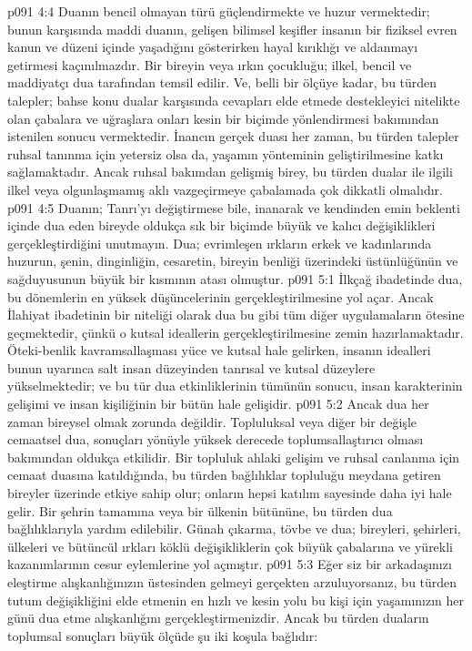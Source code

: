 \vs p091 4:4 Duanın bencil olmayan türü güçlendirmekte ve huzur vermektedir; bunun karşısında maddi duanın, gelişen bilimsel keşifler insanın bir fiziksel evren kanun ve düzeni içinde yaşadığını gösterirken hayal kırıklığı ve aldanmayı getirmesi kaçınılmazdır. Bir bireyin veya ırkın çocukluğu; ilkel, bencil ve maddiyatçı dua tarafından temsil edilir. Ve, belli bir ölçüye kadar, bu türden talepler; bahse konu dualar karşısında cevapları elde etmede destekleyici nitelikte olan çabalara ve uğraşlara onları kesin bir biçimde yönlendirmesi bakımından istenilen sonucu vermektedir. İnancın gerçek duası her zaman, bu türden talepler ruhsal tanınma için yetersiz olsa da, yaşamın yönteminin geliştirilmesine katkı sağlamaktadır. Ancak ruhsal bakımdan gelişmiş birey, bu türden dualar ile ilgili ilkel veya olgunlaşmamış aklı vazgeçirmeye çabalamada çok dikkatli olmalıdır.
\vs p091 4:5 Duanın; Tanrı’yı değiştirmese bile, inanarak ve kendinden emin beklenti içinde dua eden bireyde oldukça sık bir biçimde büyük ve kalıcı değişiklikleri gerçekleştirdiğini unutmayın. Dua; evrimleşen ırkların erkek ve kadınlarında huzurun, şenin, dinginliğin, cesaretin, bireyin benliği üzerindeki üstünlüğünün ve sağduyusunun büyük bir kısmının atası olmuştur.
\vs p091 5:1 İlkçağ ibadetinde dua, bu dönemlerin en yüksek düşüncelerinin gerçekleştirilmesine yol açar. Ancak İlahiyat ibadetinin bir niteliği olarak dua bu gibi tüm diğer uygulamaların ötesine geçmektedir, çünkü o kutsal ideallerin gerçekleştirilmesine zemin hazırlamaktadır. Öteki\hyp{}benlik kavramsallaşması yüce ve kutsal hale gelirken, insanın idealleri bunun uyarınca salt insan düzeyinden tanrısal ve kutsal düzeylere yükselmektedir; ve bu tür dua etkinliklerinin tümünün sonucu, insan karakterinin gelişimi ve insan kişiliğinin bir bütün hale gelişidir.
\vs p091 5:2 Ancak dua her zaman bireysel olmak zorunda değildir. Topluluksal veya diğer bir değişle cemaatsel dua, sonuçları yönüyle yüksek derecede toplumsallaştırıcı olması bakımından oldukça etkilidir. Bir topluluk ahlaki gelişim ve ruhsal canlanma için cemaat duasına katıldığında, bu türden bağlılıklar topluluğu meydana getiren bireyler üzerinde etkiye sahip olur; onların hepsi katılım sayesinde daha iyi hale gelir. Bir şehrin tamamına veya bir ülkenin bütününe, bu türden dua bağlılıklarıyla yardım edilebilir. Günah çıkarma, tövbe ve dua; bireyleri, şehirleri, ülkeleri ve bütüncül ırkları köklü değişikliklerin çok büyük çabalarına ve yürekli kazanımlarının cesur eylemlerine yol açmıştır.
\vs p091 5:3 Eğer siz bir arkadaşınızı eleştirme alışkanlığınızın üstesinden gelmeyi gerçekten arzuluyorsanız, bu türden tutum değişikliğini elde etmenin en hızlı ve kesin yolu bu kişi için yaşamınızın her günü dua etme alışkanlığını gerçekleştirmenizdir. Ancak bu türden duaların toplumsal sonuçları büyük ölçüde şu iki koşula bağlıdır:
